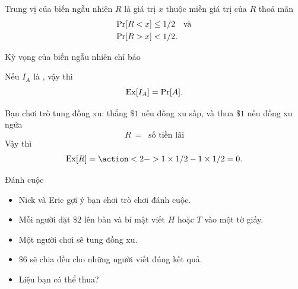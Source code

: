 \begin{frame}%
	\begin{dfntn}
		Trung vị của biến ngẫu nhiên $R$ là giá trị $x$ thuộc miền giá trị của $R$ thoả mãn 
		\begin{align*}
			\mathrm{Pr}[R < x] &\leq 1/2\quad \text{và} \\
			\mathrm{Pr}[R > x] &< 1/2.
		\end{align*}
	\end{dfntn}
\end{frame}


\begin{frame}{Kỳ vọng của biến ngẫu nhiên chỉ báo}
	\begin{lmm}
		Nếu $I_A$ là , vậy thì 
		\[
			\mathrm{Ex}[I_A] = \mathrm{Pr}[A].
		\]
	\end{lmm}
\end{frame}

\begin{frame}
	\begin{xmpl}
		Bạn chơi trò tung đồng xu: thắng $\$ 1$ nếu đồng xu sấp, và thua $\$ 1$ nếu đồng xu ngửa 
		\[
			R\ =\ \text{ số tiền lãi} 
		\]  
		Vậy thì 
		\[
			\ex[R] =\action<2->{ 1 \times 1/2 - 1\times 1/2 = 0.}
		\]
	\end{xmpl}
\end{frame}

\begin{frame}
	\begin{block}{Đánh cuộc}
		\begin{itemize}
			\item Nick và Eric gợi ý bạn chơi trò chơi đánh cuộc.
			
			\item Mỗi người đặt $\$ 2$ lên bàn  và bí mật viết $H$ hoặc $T$ vào một tờ giấy.
			\item Một người chơi sẽ tung đồng xu.
			\item $\$ 6$ sẽ chia đều cho những người viết đúng kết quả.
			
			\item Liệu bạn có thể thua?    
		\end{itemize}
	\end{block}
\end{frame}

